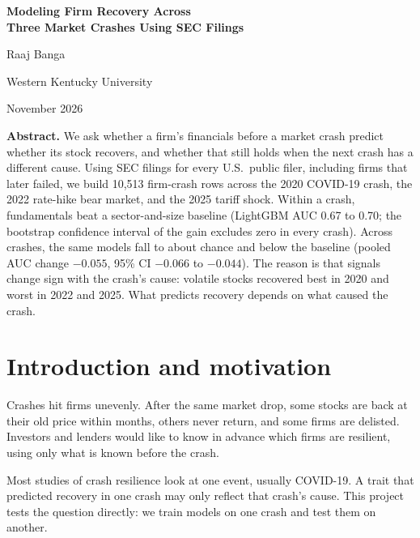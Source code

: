 \documentclass[11pt]{article}
\begin{document}
\begin{titlepage}
\centering
\vspace*{1.5in}
{\LARGE\bfseries Modeling Firm Recovery Across\\[4pt] Three Market Crashes Using SEC Filings\par}
\vspace{0.5in}
{\large Raaj Banga\par}
\vspace{6pt}
{\large Western Kentucky University\par}
\vspace{6pt}
{November 2026\par}
\vspace{0.8in}
\begin{minipage}{0.82\textwidth}
\small
\textbf{Abstract.} We ask whether a firm's financials before a market crash predict whether its stock recovers, and whether that still holds when the next crash has a different cause. Using SEC filings for every U.S.\ public filer, including firms that later failed, we build 10,513 firm-crash rows across the 2020 COVID-19 crash, the 2022 rate-hike bear market, and the 2025 tariff shock. Within a crash, fundamentals beat a sector-and-size baseline (LightGBM AUC 0.67 to 0.70; the bootstrap confidence interval of the gain excludes zero in every crash). Across crashes, the same models fall to about chance and below the baseline (pooled AUC change $-0.055$, 95\% CI $-0.066$ to $-0.044$). The reason is that signals change sign with the crash's cause: volatile stocks recovered best in 2020 and worst in 2022 and 2025. What predicts recovery depends on what caused the crash.
\end{minipage}
\end{titlepage}

\section{Introduction and motivation}

Crashes hit firms unevenly. After the same market drop, some stocks are back at their old price within months, others never return, and some firms are delisted. Investors and lenders would like to know in advance which firms are resilient, using only what is known before the crash.

Most studies of crash resilience look at one event, usually COVID-19. A trait that predicted recovery in one crash may only reflect that crash's cause. This project tests the question directly: we train models on one crash and test them on another.
\end{document}
